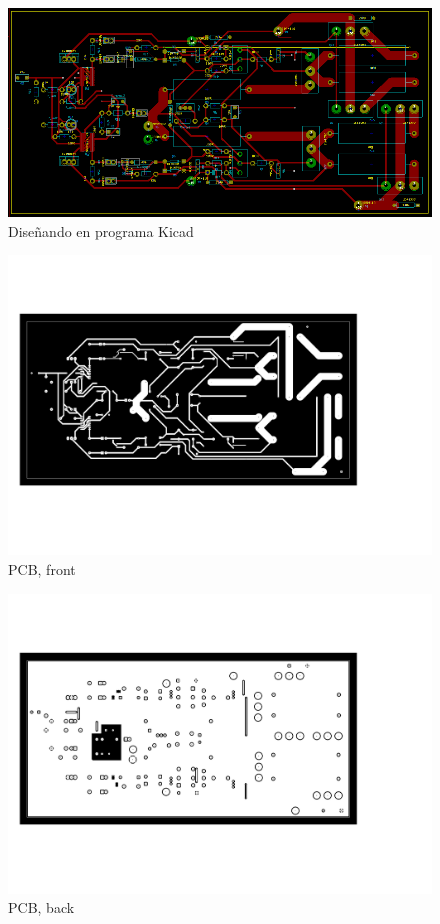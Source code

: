 \documentclass[a4paper,12pt,twoside]{article}
\begin{document}
\begin{figure}[H]
    \centering
    \includegraphics[height=0.4\textwidth]{img/PCB_kicad}
    \caption{Diseñando en programa Kicad}
    \label{fig:ac}
\end{figure}

\begin{figure}[H]
    \centering
    \includegraphics[height=0.7\textwidth]{img/amplificador-F.pdf}
    \caption{PCB, front}
    \label{fig:ac}
\end{figure}

\begin{figure}[H]
    \centering
    \includegraphics[height=0.7\textwidth]{img/amplificador-B.pdf}
    \caption{PCB, back}
    \label{fig:ac}
\end{figure}
\end{document}

